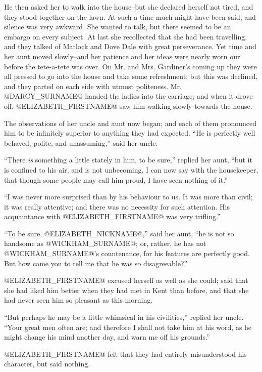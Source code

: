 He then asked her to walk into the house--but she declared herself not
tired, and they stood together on the lawn. At such a time much might
have been said, and silence was very awkward. She wanted to talk, but
there seemed to be an embargo on every subject. At last she recollected
that she had been travelling, and they talked of Matlock and Dove Dale
with great perseverance. Yet time and her aunt moved slowly--and her
patience and her ideas were nearly worn our before the tete-a-tete was
over. On Mr. and Mrs. Gardiner's coming up they were all pressed to go
into the house and take some refreshment; but this was declined, and
they parted on each side with utmost politeness. Mr. @DARCY_SURNAME@ handed the
ladies into the carriage; and when it drove off, @ELIZABETH_FIRSTNAME@ saw him
walking slowly towards the house.

The observations of her uncle and aunt now began; and each of them
pronounced him to be infinitely superior to anything they had expected.
``He is perfectly well behaved, polite, and unassuming,'' said her uncle.

``There \textit{is} something a little stately in him, to be sure,'' replied her
aunt, ``but it is confined to his air, and is not unbecoming. I can now
say with the housekeeper, that though some people may call him proud, I
have seen nothing of it.''

``I was never more surprised than by his behaviour to us. It was more
than civil; it was really attentive; and there was no necessity for such
attention. His acquaintance with @ELIZABETH_FIRSTNAME@ was very trifling.''

``To be sure, @ELIZABETH_NICKNAME@,'' said her aunt, ``he is not so handsome as @WICKHAM_SURNAME@;
or, rather, he has not @WICKHAM_SURNAME@'s countenance, for his features
are perfectly good. But how came you to tell me that he was so
disagreeable?''

@ELIZABETH_FIRSTNAME@ excused herself as well as she could; said that she had liked
him better when they had met in Kent than before, and that she had never
seen him so pleasant as this morning.

``But perhaps he may be a little whimsical in his civilities,'' replied
her uncle. ``Your great men often are; and therefore I shall not take him
at his word, as he might change his mind another day, and warn me off
his grounds.''

@ELIZABETH_FIRSTNAME@ felt that they had entirely misunderstood his character, but
said nothing.

